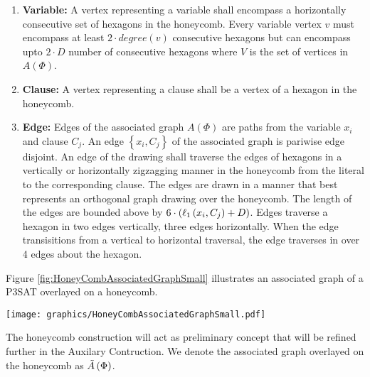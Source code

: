 \begin{enumerate}
\item \textbf{Variable:} A vertex representing a variable shall encompass a horizontally consecutive set of hexagons in the honeycomb. 
Every variable vertex $v$  must encompass at least $2 \cdot degree(v)$ consecutive hexagons but can encompass upto $2 \cdot D$ number of consecutive hexagons where $V$ is the set of vertices in $A(\Phi)$.
\item \textbf{Clause:} A vertex representing a clause shall be a vertex of a hexagon in the honeycomb.
\item \textbf{Edge:} Edges of the associated graph $A(\Phi)$ are paths from the variable $x_i$ and clause $C_j$.  An edge $\left\lbrace x_i, C_j \right\rbrace$ of the associated graph is pariwise edge disjoint. 
An edge of the drawing shall traverse the edges of hexagons in a vertically or horizontally zigzagging manner in the honeycomb from the literal to the corresponding clause. 
The edges are drawn in a manner that best represents an orthogonal graph drawing over the honeycomb.  
The length of the edges are bounded above by $6 \cdot \left( \ell_1 \left( x_i,C_j \right) + D \right)$. Edges traverse a hexagon in two edges vertically, three edges horizontally.
  When the edge transisitions from a vertical to horizontal traversal, the edge traverses in over 4 edges about the hexagon.
\end{enumerate}
Figure \ref{fig:HoneyCombAssociatedGraphSmall} illustrates an associated graph of a P3SAT overlayed on a honeycomb.

\begin{minipage}{\linewidth}
\begin{center}
\texttt{[image: graphics/HoneyCombAssociatedGraphSmall.pdf]}
\label{fig:HoneyCombAssociatedGraphSmall}
\end{center}
\end{minipage}

The honeycomb construction will act as preliminary concept that will be refined further in the Auxilary Contruction.
We denote the associated graph overlayed on the honeycomb as $\tilde{A}\left( \Phi \right)$.
